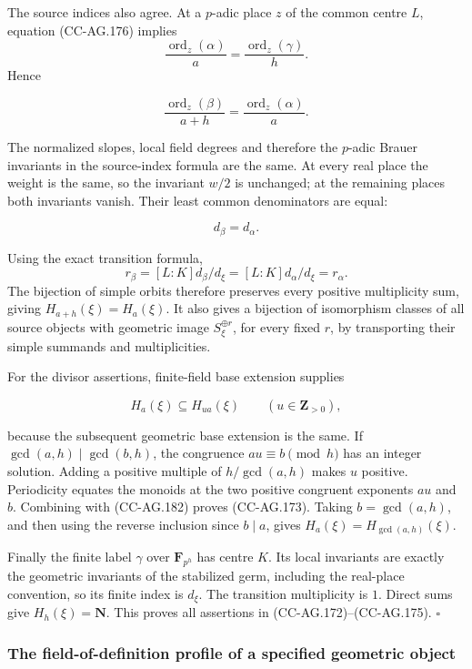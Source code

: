 The source indices also agree. At a \(p\)-adic place \(z\) of the common
centre \(L\), equation (CC-AG.176) implies \[
 \frac{\operatorname{ord}_z(\alpha)}{a}
       =\frac{\operatorname{ord}_z(\gamma)}{h}.
\] Hence

\[
 \frac{\operatorname{ord}_z(\beta)}{a+h}
       =\frac{\operatorname{ord}_z(\alpha)}{a}.
 \tag{CC-AG.179}
\]

The normalized slopes, local field degrees and therefore the \(p\)-adic
Brauer invariants in the source-index formula are the same. At every
real place the weight is the same, so the invariant \(w/2\) is
unchanged; at the remaining places both invariants vanish. Their least
common denominators are equal:

\[
                              d_\beta=d_\alpha.
 \tag{CC-AG.180}
\]

Using the exact transition formula, \[
 r_\beta=[L:K]d_\beta/d_\xi
        =[L:K]d_\alpha/d_\xi=r_\alpha.
 \tag{CC-AG.181}
\] The bijection of simple orbits therefore preserves every positive
multiplicity sum, giving \(H_{a+h}(\xi)=H_a(\xi)\). It also gives a
bijection of isomorphism classes of all source objects with geometric
image \(S_\xi^{\oplus r}\), for every fixed \(r\), by transporting their
simple summands and multiplicities.

For the divisor assertions, finite-field base extension supplies

\[
                         H_a(\xi)\subseteq H_{ua}(\xi)
                       \qquad(u\in\mathbf Z_{>0}),
 \tag{CC-AG.182}
\]

because the subsequent geometric base extension is the same. If
\(\gcd(a,h)\mid\gcd(b,h)\), the congruence \(au\equiv b\pmod h\) has an
integer solution. Adding a positive multiple of \(h/\gcd(a,h)\) makes
\(u\) positive. Periodicity equates the monoids at the two positive
congruent exponents \(au\) and \(b\). Combining with (CC-AG.182) proves
(CC-AG.173). Taking \(b=\gcd(a,h)\), and then using the reverse
inclusion since \(b\mid a\), gives \(H_a(\xi)=H_{\gcd(a,h)}(\xi)\).

Finally the finite label \(\gamma\) over \(\mathbf F_{p^h}\) has centre
\(K\). Its local invariants are exactly the geometric invariants of the
stabilized germ, including the real-place convention, so its finite
index is \(d_\xi\). The transition multiplicity is \(1\). Direct sums
give \(H_h(\xi)=\mathbf N\). This proves all assertions in
(CC-AG.172)--(CC-AG.175). \(\square\)

\subsubsection{The field-of-definition profile of a specified geometric
object}\label{the-field-of-definition-profile-of-a-specified-geometric-object}

